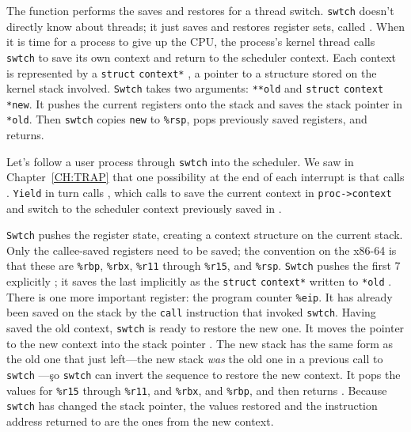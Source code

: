 The function
performs the saves and restores for a thread switch.
\lstinline{swtch}
doesn't directly know about threads; it just saves and
restores register sets, called 
.
When it is time for a process to give up the CPU,
the process's kernel thread calls
\lstinline{swtch}
to save its own context and return to the scheduler context.
Each context is represented by a
\lstinline{struct}
\lstinline{context*}
,
a pointer to a structure stored on the kernel stack involved.
\lstinline{Swtch}
takes two arguments:
\lstinline{**old}
and
\lstinline{struct}
\lstinline{context}
\lstinline{*new}.
It pushes the current registers onto the stack
and saves the stack pointer in
\lstinline{*old}.
Then
\lstinline{swtch}
copies
\lstinline{new}
to 
\texttt{\%rsp},
pops previously saved registers, and returns.

Let's follow a user process through
\lstinline{swtch} 
into the scheduler.
We saw in Chapter~\ref{CH:TRAP}
that one possibility at the end of each interrupt
is that 
calls 
.
\lstinline{Yield}
in turn calls
,
which calls
to save the current context in
\lstinline{proc->context}
and switch to the scheduler context previously saved in 
.

\lstinline{Swtch}
pushes the register state, creating a context structure
on the current stack.
Only the callee-saved registers need to be saved;
the convention on the x86-64 is that these are
\texttt{\%rbp},
\texttt{\%rbx},
\texttt{\%r11}
through
\texttt{\%r15},
and
\texttt{\%rsp}.
\lstinline{Swtch}
pushes the first 7 explicitly
;
it saves the last implicitly as the
\lstinline{struct}
\lstinline{context*}
written to
\lstinline{*old} 
.
There is one more important register:
the program counter 
\texttt{\%eip}.
It has already been saved on the stack by the
\lstinline{call}
instruction that invoked
\lstinline{swtch}.
Having saved the old context,
\lstinline{swtch}
is ready to restore the new one.
It moves the pointer to the new context
into the stack pointer
.
The new stack has the same form as the old one that
just left—the new stack
\textit{was}
the old one in a previous call to
\lstinline{swtch} —\c
so 
\lstinline{swtch}
can invert the sequence to restore the new context.
It pops the values for
\texttt{\%r15}
through
\texttt{\%r11},
and
\texttt{\%rbx},
and
\texttt{\%rbp},
and then returns
.
Because 
\lstinline{swtch}
has changed the stack pointer, the values restored
and the instruction address returned to
are the ones from the new context.

